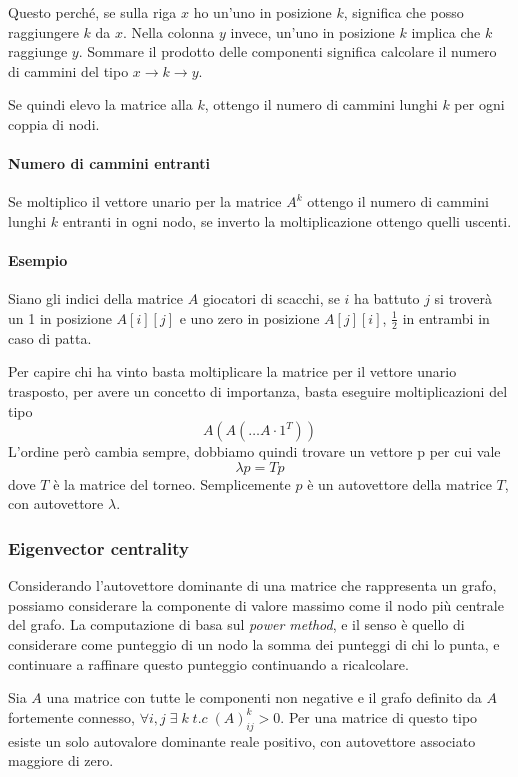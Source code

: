Questo perché, se sulla riga $x$ ho un'uno in posizione $k$, significa che posso raggiungere 
$k$ da $x$. Nella colonna $y$ invece, un'uno in posizione $k$ implica che $k$ raggiunge $y$.
Sommare il prodotto delle componenti significa calcolare il numero di cammini del tipo 
$x \rightarrow k \rightarrow y$.

Se quindi elevo la matrice alla $k$, ottengo il numero di cammini lunghi $k$ per ogni 
coppia di nodi.

\paragraph{Numero di cammini entranti}
Se moltiplico il vettore unario per la matrice $A^k$ ottengo il numero di cammini 
lunghi $k$ entranti in ogni nodo, se inverto la moltiplicazione ottengo quelli 
uscenti.

\paragraph{Esempio}
Siano gli indici della matrice $A$ giocatori di scacchi, se $i$ ha battuto $j$ 
si troverà un 1 in posizione $A[i][j]$ e uno zero in posizione $A[j][i]$, $\frac{1}
{2}$ in entrambi
in caso di patta.

Per capire chi ha vinto basta moltiplicare la matrice per il vettore unario trasposto, 
per avere un concetto di importanza, basta eseguire moltiplicazioni del tipo 
$$A(A(\dots A\cdot 1^T))$$
L'ordine però cambia sempre, dobbiamo quindi trovare un vettore p per cui vale 
$$\lambda p = T p$$
dove $T$ è la matrice del torneo. Semplicemente $p$ è un autovettore della matrice $T$, 
con autovettore $\lambda$.

\subsubsection{Eigenvector centrality}
Considerando l'autovettore dominante di una matrice che rappresenta un grafo, 
possiamo considerare la componente di valore massimo come il nodo più centrale del grafo.
La computazione di basa sul \emph{power method}, e il senso è quello di considerare come punteggio di un nodo la somma dei punteggi di chi lo punta, e continuare a 
raffinare questo punteggio continuando a ricalcolare.

\begin{theorem}
    Sia $A$ una matrice con tutte le componenti non negative e il grafo definito da $A$
    fortemente connesso, $\forall i,j\;\exists\;k\;t.c\; (A)^k_{ij} > 0$. 
    Per una matrice di questo tipo esiste un solo autovalore dominante reale positivo, 
    con autovettore associato maggiore di zero.
\end{theorem}

